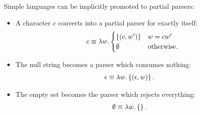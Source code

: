 Simple languages can be implicitly promoted to partial parsers:
\begin{itemize}
\item
A character $c$ converts into a partial parser for exactly itself:
\begin{align*}
c \equiv
\lambda w . 
\begin{cases}
\left\{ (c,w') \right\} &   w = c w'
\\
\emptyset & \text{otherwise.}
\end{cases}
\end{align*}

\item
The null string becomes a parser which consumes nothing:
\begin{align*}
 \epsilon &\equiv \lambda w . \left\{ (\epsilon, w) \right\} 
 \text.
\end{align*}


\item
The empty set becomes the parser which rejects everything:
\begin{align*}
 \emptyset &\equiv \lambda w . \left\{\right\}
 \text.
\end{align*}



\end{itemize}



